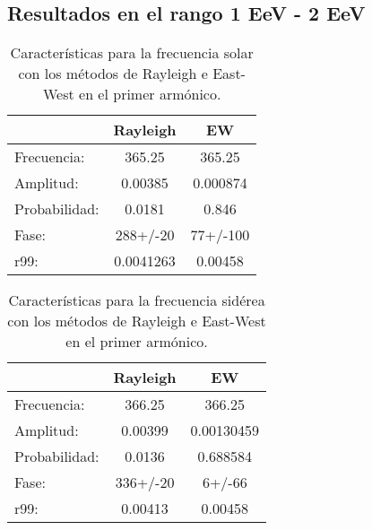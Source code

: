\subsection*{Resultados en el rango 1 EeV - 2 EeV}
\begin{table}[H]
    \begin{small}
        \begin{center}
            \begin{tabular}[c]{l|c|c}
                                & Rayleigh      & EW            \\\hline
                Frecuencia:     & 365.25	 & 365.25         \\
                Amplitud:       & 0.00385   & 0.000874    \\
                Probabilidad:   & 0.0181   & 0.846     \\
                Fase:           & 288+/-20   & 77+/-100           \\
                r99:            & 0.0041263   & 0.00458  \\
            \end{tabular}
        \end{center}
    \end{small}
    \caption{Características para la frecuencia solar con los métodos de Rayleigh  e East-West en el primer armónico.}
    \label{tab:solar}
\end{table}

\begin{table}[H]
    \begin{small}
        \begin{center}
            \begin{tabular}[c]{l|c|c}
                                & Rayleigh     & EW         \\\hline
                Frecuencia:     & 366.25	   & 366.25        \\
                Amplitud:       & 0.00399	   &0.00130459     \\
                Probabilidad:   & 0.0136	   &0.688584     \\
                Fase:           & 336+/-20	   &6+/-66          \\
                r99:            & 0.00413	   &0.00458  \\
            \end{tabular}
        \end{center}
    \end{small}
    \caption{Características para la frecuencia sidérea con los métodos de Rayleigh  e East-West en el primer armónico.}
    \label{tab:solar}
\end{table}


